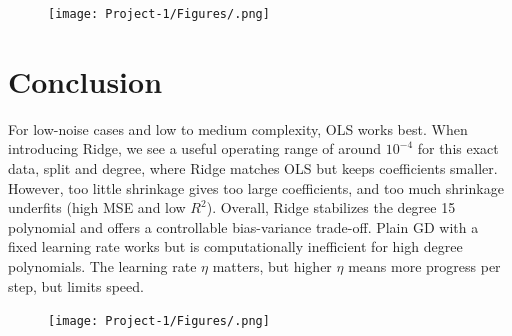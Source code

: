 \documentclass[amssymb,twocolumn,aps]{revtex4-2}
\begin{document}
\begin{figure}[H]
    \centering
    \texttt{[image: Project-1/Figures/.png]}
    \caption{}
    \label{fig:}
\end{figure}




\section{Conclusion}\label{section:conclusion} 

For low-noise cases and low to medium complexity, OLS works best. When introducing Ridge, we see a useful operating range of around $10^{-4}$ for this exact data, split and degree, where Ridge matches OLS but keeps coefficients smaller. However, too little shrinkage gives too large coefficients, and too much shrinkage underfits (high MSE and low $R^2$). Overall, Ridge stabilizes the degree 15 polynomial and offers a controllable bias-variance trade-off. Plain GD with a fixed learning rate works but is computationally inefficient for high degree polynomials. The learning rate $\eta$ matters, but higher $\eta$ means more progress per step, but limits speed. 

\begin{figure}[H]
    \centering
    \texttt{[image: Project-1/Figures/.png]}
    \caption{}
    \label{fig:}
\end{figure}


\end{document}
